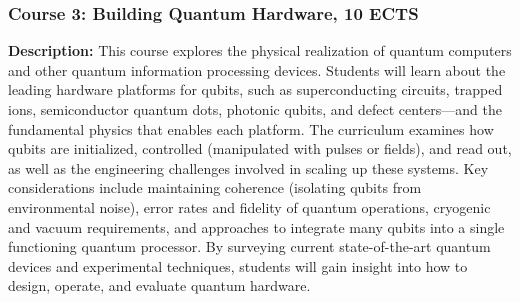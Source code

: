 \documentclass{scrreprt}
\begin{document}
\subsubsection{Course 3: Building Quantum Hardware, 10 ECTS}

\textbf{Description:} This course explores the physical realization of
quantum computers and other quantum information processing
devices. Students will learn about the leading hardware platforms for
qubits, such as superconducting circuits, trapped ions, semiconductor
quantum dots, photonic qubits, and defect centers—and the fundamental
physics that enables each platform. The curriculum examines how qubits
are initialized, controlled (manipulated with pulses or fields), and
read out, as well as the engineering challenges involved in scaling up
these systems. Key considerations include maintaining coherence
(isolating qubits from environmental noise), error rates and fidelity
of quantum operations, cryogenic and vacuum requirements, and
approaches to integrate many qubits into a single functioning quantum
processor. By surveying current state-of-the-art quantum devices and
experimental techniques, students will gain insight into how to
design, operate, and evaluate quantum hardware.
\end{document}
